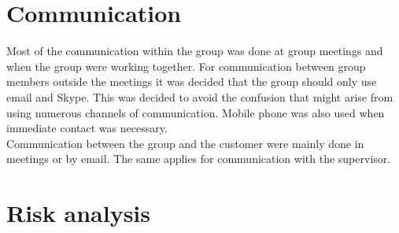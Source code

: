 \section{Communication}
Most of the communication within the group was done at group meetings and when the group were working together. For communication between group members outside the meetings it was decided that the group should only use email and Skype. This was decided to avoid the confusion that might arise from using numerous channels of communication. Mobile phone was also used when immediate contact was necessary.\\
\newline
Communication between the group and the customer were mainly done in meetings or by email. The same applies for communication with the supervisor.

\section{Risk analysis}
